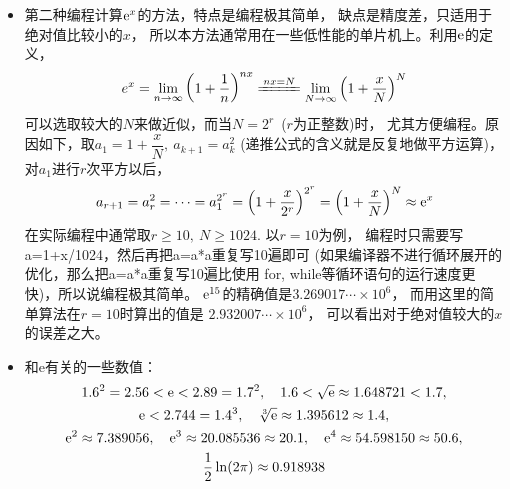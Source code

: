 \begin{itemize}[leftmargin=\inteval{\myitemleftmargin}pt,itemsep=
   \inteval{\myitemitempsep}pt,topsep=\inteval{\myitemtopsep}pt]
\item 第二种编程计算$ \mathrm{e}^x $的方法，特点是编程极其简单，
缺点是精度差，只适用于绝对值比较小的$ x $，
所以本方法通常用在一些低性能的单片机上。利用$ \mathrm{e} $的定义，
\begin{gather*}
    e^x=\lim_{n\to\infty}\left(1+ \dfrac{1}{n}\right)^{nx}\xlongequal{nx=N}
    \lim_{N\to\infty}\left(1+\dfrac{x}{N}\right)^{N}
\end{gather*}
可以选取较大的$ N $来做近似，而当$ N=2^r $\ ($ r $为正整数)时，
尤其方便编程。原因如下，取$ a_1=1+\dfrac{x}{N},\ a_{k+1}=a_k^2 $
(递推公式的含义就是反复地做平方运算)，对$ a_1 $进行$ r $次平方以后，
\begin{gather}\label{exp(x)快速算法}
    a_{r+1}=a_r^2=\cdots=a_1^{2^{r}}=\left(1+\dfrac{x}{2^r}\right)^{2^r}=
    \left(1+\dfrac{x}{N}\right)^{N}\approx \mathrm{e}^x
\end{gather}
在实际编程中通常取$ r\geq 10,\ N\geq 1024 $. 以$ r=10 $为例，
编程时只需要写a=1+x/1024，然后再把a=a*a重复写10遍即可
(如果编译器不进行循环展开的优化，那么把a=a*a重复写10遍比使用
for, while等循环语句的运行速度更快)，所以说编程极其简单。
$ \mathrm{e}^{15} $的精确值是$ 3.269017\cdots \times 10^6 $，
而用这里的简单算法在$ r=10 $时算出的值是
$ 2.932007\cdots\times10^6 $，
可以看出对于绝对值较大的$ x $的误差之大。

\item 和e有关的一些数值：
\begin{gather*}
    1.6^2=2.56<\mathrm{e}<2.89=1.7^2,\quad 1.6<\sqrt{\mathrm{e}}\approx 1.648721<1.7, \\
    \mathrm{e}<2.744=1.4^3,\quad \sqrt[3]{\mathrm{e}}\approx 1.395612\approx 1.4, \\    
    \mathrm{e}^2\approx 7.389056,\quad  \mathrm{e}^3\approx 20.085536\approx 20.1 ,
    \quad \mathrm{e}^4\approx 54.598150\approx 50.6, \\
    \dfrac{1}{2}\ln(2\pi)\approx 0.918938
\end{gather*}


\end{itemize}
